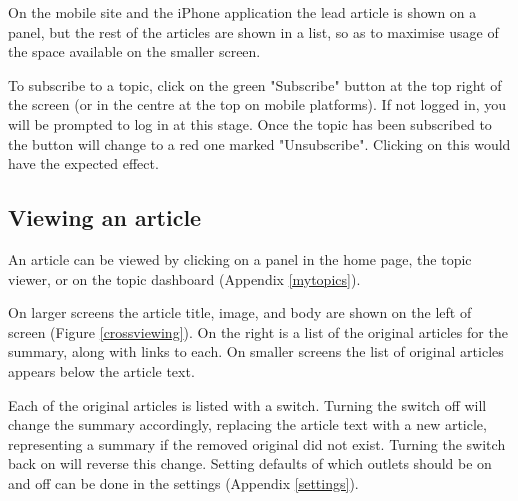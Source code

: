 \documentclass[12pt]{article}
\begin{document}
\begin{appendices}
On the mobile site and the iPhone application the lead article is shown on a panel, but the rest of the articles are shown in a list, so as to maximise usage of the space available on the smaller screen. 

To subscribe to a topic, click on the green "Subscribe" button at the top right of the screen (or in the centre at the top on mobile platforms). If not logged in, you will be prompted to log in at this stage. Once the topic has been subscribed to the button will change to a red one marked "Unsubscribe". Clicking on this would have the expected effect.

\label{viewingtopic}

\subsection{Viewing an article}

An article can be viewed by clicking on a panel in the home page, the topic viewer, or on the topic dashboard (Appendix \ref{mytopics}). 

On larger screens the article title, image, and body are shown on the left of screen (Figure \ref{crossviewing}). On the right is a list of the original articles for the summary, along with links to each. On smaller screens the list of original articles appears below the article text.

Each of the original articles is listed with a switch. Turning the switch off will change the summary accordingly, replacing the article text with a new article, representing a summary if the removed original did not exist. Turning the switch back on will reverse this change. Setting defaults of which outlets should be on and off can be done in the settings (Appendix \ref{settings}).


\end{appendices}
\end{document}
